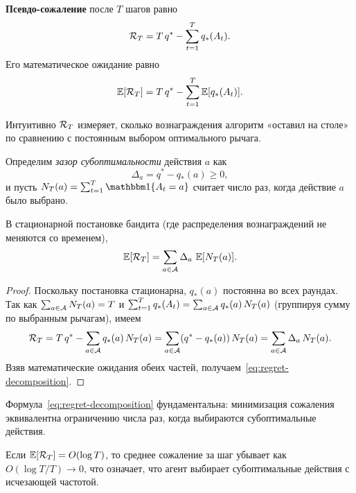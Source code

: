 \begin{definition}
\label{def:pseudo-regret}
\textbf{Псевдо-сожаление} после $T$ шагов равно
\begin{equation}
\label{eq:regret}
\mathcal{R}_T = T\,q^* - \sum_{t=1}^{T} q_*(A_t).
\end{equation}
Его математическое ожидание равно
\[
\operatorname{\mathbb{E}}[\mathcal{R}_T] = T\,q^* - \sum_{t=1}^{T}\operatorname{\mathbb{E}}[q_*(A_t)].
\]
\end{definition}

Интуитивно $\mathcal{R}_T$ измеряет, сколько вознаграждения алгоритм «оставил на столе» по сравнению с постоянным выбором оптимального рычага.

Определим \emph{зазор субоптимальности} действия $a$ как
\begin{equation}
\label{eq:gap}
\Delta_a = q^* - q_*(a) \ge 0,
\end{equation}
и пусть $N_T(a) = \sum_{t=1}^{T}\ind\{A_t = a\}$ считает число раз, когда действие $a$ было выбрано.

\begin{proposition}
\label{prop:regret-decomp}
В стационарной постановке бандита (где распределения вознаграждений не меняются со временем),
\begin{equation}
\label{eq:regret-decomposition}
\operatorname{\mathbb{E}}[\mathcal{R}_T] = \sum_{a\in\mathcal{A}} \Delta_a\,\operatorname{\mathbb{E}}[N_T(a)].
\end{equation}
\end{proposition}

\begin{proof}
Поскольку постановка стационарна, $q_*(a)$ постоянна во всех раундах.
Так как $\sum_{a\in\mathcal{A}}N_T(a)=T$ и $\sum_{t=1}^{T}q_*(A_t)=\sum_{a\in\mathcal{A}}q_*(a)\,N_T(a)$ (группируя сумму по выбранным рычагам), имеем
\[
\mathcal{R}_T
= T\,q^* - \sum_{a\in\mathcal{A}}q_*(a)\,N_T(a)
= \sum_{a\in\mathcal{A}}(q^*-q_*(a))\,N_T(a)
= \sum_{a\in\mathcal{A}}\Delta_a\,N_T(a).
\]
Взяв математические ожидания обеих частей, получаем~\eqref{eq:regret-decomposition}.
\end{proof}

Формула~\eqref{eq:regret-decomposition} фундаментальна: минимизация сожаления эквивалентна ограничению числа раз, когда выбираются субоптимальные действия.

\begin{remark}
Если $\operatorname{\mathbb{E}}[\mathcal{R}_T]=O(\log T)$, то среднее сожаление за шаг убывает как $O(\log T/T)\to 0$, что означает, что агент выбирает субоптимальные действия с исчезающей частотой.
\end{remark}


